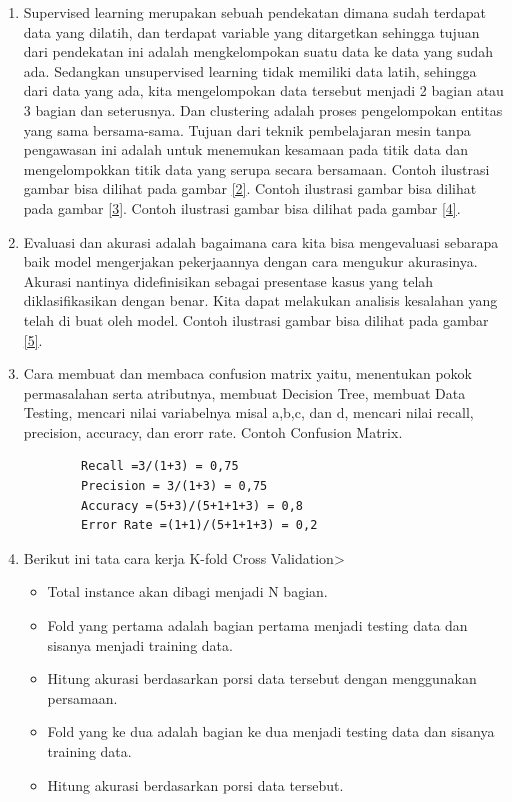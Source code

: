 \begin{enumerate}
\item Supervised learning merupakan sebuah pendekatan dimana sudah terdapat data yang dilatih, dan terdapat variable yang ditargetkan sehingga tujuan dari pendekatan ini adalah mengkelompokan suatu data ke data yang sudah ada. Sedangkan unsupervised learning tidak memiliki data latih, sehingga dari data yang ada, kita mengelompokan data tersebut menjadi 2 bagian atau 3 bagian dan seterusnya. Dan clustering adalah proses pengelompokan entitas yang sama bersama-sama. Tujuan dari teknik pembelajaran mesin tanpa pengawasan ini adalah untuk menemukan kesamaan pada titik data dan mengelompokkan titik data yang serupa secara bersamaan\cite{zhu2009introduction}.
\subitem Contoh ilustrasi gambar bisa dilihat pada gambar \ref{2}.
\subitem Contoh ilustrasi gambar bisa dilihat  pada gambar \ref{3}.
\subitem Contoh ilustrasi gambar bisa dilihat pada gambar \ref{4}.
\item Evaluasi dan akurasi adalah bagaimana cara kita bisa mengevaluasi sebarapa baik model mengerjakan pekerjaannya dengan cara mengukur akurasinya. Akurasi nantinya didefinisikan sebagai presentase kasus yang telah diklasifikasikan dengan benar. Kita dapat melakukan analisis kesalahan yang telah di buat oleh model.
\subitem Contoh ilustrasi gambar bisa dilihat pada gambar \ref{5}.
\item Cara membuat dan membaca confusion matrix yaitu, menentukan pokok permasalahan serta atributnya, membuat Decision Tree, membuat Data Testing, mencari nilai variabelnya misal a,b,c, dan d, mencari nilai recall, precision, accuracy, dan erorr rate.
\subitem Contoh Confusion Matrix.
\begin{verbatim}
		Recall =3/(1+3) = 0,75
		Precision = 3/(1+3) = 0,75
		Accuracy =(5+3)/(5+1+1+3) = 0,8
		Error Rate =(1+1)/(5+1+1+3) = 0,2 
\end{verbatim}
\item Berikut ini tata cara kerja K-fold Cross Validation>
	\begin{itemize}
		\item Total instance akan dibagi menjadi N bagian.
		\item Fold yang pertama adalah bagian pertama menjadi testing data dan sisanya menjadi training data.
		\item Hitung akurasi berdasarkan porsi data tersebut dengan menggunakan persamaan.
		\item Fold yang ke dua adalah bagian ke dua menjadi testing data dan sisanya training data. 
		\item Hitung akurasi berdasarkan porsi data tersebut.

\end{itemize}
\end{enumerate}
